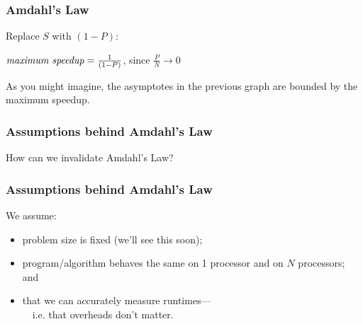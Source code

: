 \documentclass[aspectratio=43]{beamer}
\newenvironment{changemargin}[1]{%
  \begin{list}{}{%
    \setlength{\topsep}{0pt}%
    \setlength{\leftmargin}{#1}%
    \setlength{\rightmargin}{1em}
    \setlength{\listparindent}{\parindent}%
    \setlength{\itemindent}{\parindent}%
    \setlength{\parsep}{\parskip}%
  }%
  \item[]}{\end{list}}
\begin{document}
\begin{frame}
  \frametitle{Amdahl's Law}

 \hspace*{2em}Replace $S$ with $(1 - P)$:

  \begin{center}
  \end{center}
  \vfill
  \begin{center}
    $\mbox{\em maximum speedup} = \frac{1}{(1 - P)}$, since $\frac{P}{N} \rightarrow 0$
  \end{center}
  \vfill
  \hspace*{2em}\begin{minipage}{.8\textwidth}As you might imagine, the asymptotes in the previous graph are bounded by the
  maximum speedup.\end{minipage}
\end{frame}

\begin{frame}
  \frametitle{Assumptions behind Amdahl's Law}

  \begin{changemargin}{2cm}
    How can we invalidate Amdahl's Law?
  \end{changemargin}
  
\end{frame}

\begin{frame}
  \frametitle{Assumptions behind Amdahl's Law}

  \begin{changemargin}{2cm}
    We assume:
    \begin{itemize}
    \item problem size is fixed (we'll see this soon);
    \item program/algorithm behaves the same on 1 processor and on $N$ processors; and
    \item that we can accurately measure runtimes---\\ ~~i.e. that overheads don't matter.
    \end{itemize}
  \end{changemargin}
  
\end{frame}
\end{document}
